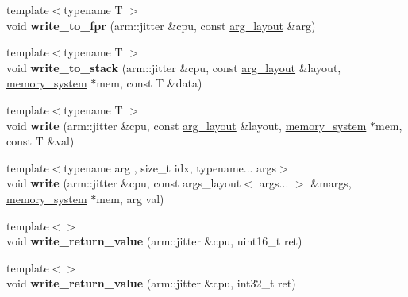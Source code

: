 \begin{DoxyCompactItemize}
\item 
\mbox{\label{namespaceeka2l1_1_1hle_a1c6ecd94770048f1183f6d46da136ebb}} 
{\footnotesize template$<$typename T $>$ }\\void {\bfseries write\+\_\+to\+\_\+fpr} (arm\+::jitter \&cpu, const \mbox{\hyperlink{structeka2l1_1_1hle_1_1arg__layout}{arg\+\_\+layout}} \&arg)
\item 
\mbox{\label{namespaceeka2l1_1_1hle_a18301438eaf413cdb8f99d19d9e384ba}} 
{\footnotesize template$<$typename T $>$ }\\void {\bfseries write\+\_\+to\+\_\+stack} (arm\+::jitter \&cpu, const \mbox{\hyperlink{structeka2l1_1_1hle_1_1arg__layout}{arg\+\_\+layout}} \&layout, \mbox{\hyperlink{classeka2l1_1_1memory__system}{memory\+\_\+system}} $\ast$mem, const T \&data)
\item 
\mbox{\label{namespaceeka2l1_1_1hle_ad93869b90ae689e9a864034429279bb6}} 
{\footnotesize template$<$typename T $>$ }\\void {\bfseries write} (arm\+::jitter \&cpu, const \mbox{\hyperlink{structeka2l1_1_1hle_1_1arg__layout}{arg\+\_\+layout}} \&layout, \mbox{\hyperlink{classeka2l1_1_1memory__system}{memory\+\_\+system}} $\ast$mem, const T \&val)
\item 
\mbox{\label{namespaceeka2l1_1_1hle_ae30d055617b11dff5be32ca7db4b414c}} 
{\footnotesize template$<$typename arg , size\+\_\+t idx, typename... args$>$ }\\void {\bfseries write} (arm\+::jitter \&cpu, const args\+\_\+layout$<$ args... $>$ \&margs, \mbox{\hyperlink{classeka2l1_1_1memory__system}{memory\+\_\+system}} $\ast$mem, arg val)
\item 
\mbox{\label{namespaceeka2l1_1_1hle_acacf05da69d71c973729f47a74fd5dd4}} 
{\footnotesize template$<$$>$ }\\void {\bfseries write\+\_\+return\+\_\+value} (arm\+::jitter \&cpu, uint16\+\_\+t ret)
\item 
\mbox{\label{namespaceeka2l1_1_1hle_a50660051503c6dc8bff0f5e6cc060c64}} 
{\footnotesize template$<$$>$ }\\void {\bfseries write\+\_\+return\+\_\+value} (arm\+::jitter \&cpu, int32\+\_\+t ret)

\end{DoxyCompactItemize}
